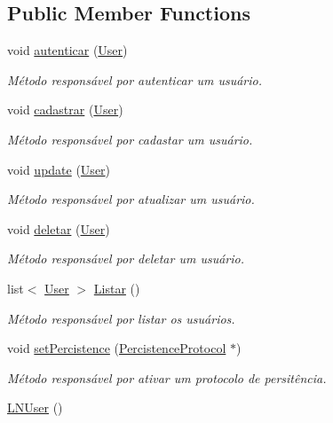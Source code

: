 \subsection*{Public Member Functions}
\begin{DoxyCompactItemize}
\item 
void \hyperlink{class_l_n_user_a74c91c7a9e6d8ceaf8ebfed027178221}{autenticar} (\hyperlink{class_user}{User})
\begin{DoxyCompactList}\small\item\em Método responsável por autenticar um usuário. \end{DoxyCompactList}\item 
void \hyperlink{class_l_n_user_a4702a50096c617aa7a9ea9b25fda3063}{cadastrar} (\hyperlink{class_user}{User})
\begin{DoxyCompactList}\small\item\em Método responsável por cadastar um usuário. \end{DoxyCompactList}\item 
void \hyperlink{class_l_n_user_a4093083f84eec431151c7315b5064b88}{update} (\hyperlink{class_user}{User})
\begin{DoxyCompactList}\small\item\em Método responsável por atualizar um usuário. \end{DoxyCompactList}\item 
void \hyperlink{class_l_n_user_ac2058724d8d0b2ab8da440b9acc2b80a}{deletar} (\hyperlink{class_user}{User})
\begin{DoxyCompactList}\small\item\em Método responsável por deletar um usuário. \end{DoxyCompactList}\item 
\hypertarget{class_l_n_user_a49a8cb98850d1812aa504fd7ec1c64f0}{list$<$ \hyperlink{class_user}{User} $>$ \hyperlink{class_l_n_user_a49a8cb98850d1812aa504fd7ec1c64f0}{Listar} ()}\label{class_l_n_user_a49a8cb98850d1812aa504fd7ec1c64f0}

\begin{DoxyCompactList}\small\item\em Método responsável por listar os usuários. \end{DoxyCompactList}\item 
void \hyperlink{class_l_n_user_aadeddd422a7e5b1b7059b472dcee1631}{set\-Percistence} (\hyperlink{class_percistence_protocol}{Percistence\-Protocol} $\ast$)
\begin{DoxyCompactList}\small\item\em Método responsável por ativar um protocolo de persitência. \end{DoxyCompactList}\item 
\hypertarget{class_l_n_user_aacf199ac94fc28825e3692aa097fe842}{\hyperlink{class_l_n_user_aacf199ac94fc28825e3692aa097fe842}{L\-N\-User} ()}\label{class_l_n_user_aacf199ac94fc28825e3692aa097fe842}


\end{DoxyCompactItemize}
